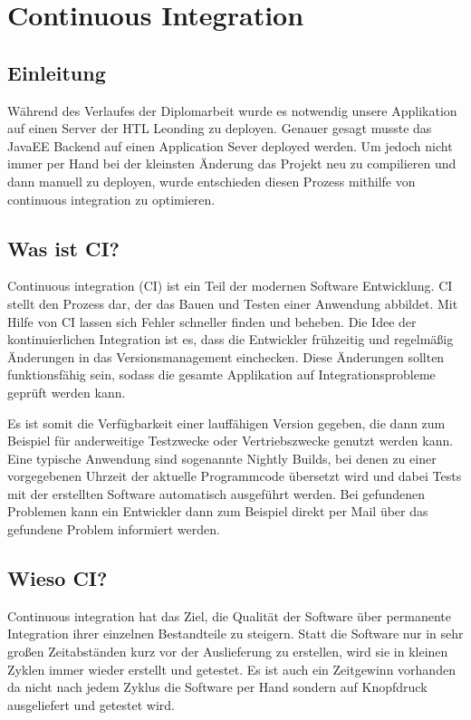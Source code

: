 \chapter{Continuous Integration}
\section{Einleitung}\label{sec:einleitung}
Während des Verlaufes der Diplomarbeit wurde es notwendig unsere Applikation auf einen Server der HTL Leonding zu deployen. Genauer gesagt musste das JavaEE Backend auf einen Application Sever deployed werden. Um jedoch nicht immer per Hand bei der kleinsten Änderung das Projekt neu zu compilieren und dann manuell zu deployen, wurde entschieden diesen Prozess mithilfe von continuous integration zu optimieren.

\section{Was ist CI?}\label{sec:cierklärung}
Continuous integration (CI) ist ein Teil der modernen Software Entwicklung. CI stellt den Prozess dar, der das Bauen und Testen einer Anwendung abbildet. Mit Hilfe von CI lassen sich Fehler schneller finden und beheben. Die Idee der kontinuierlichen Integration ist es, dass die Entwickler frühzeitig und regelmäßig Änderungen in das Versionsmanagement einchecken. Diese Änderungen sollten funktionsfähig sein, sodass die gesamte Applikation auf Integrationsprobleme geprüft werden kann.

Es ist somit die Verfügbarkeit einer lauffähigen Version gegeben, die dann zum Beispiel für anderweitige Testzwecke oder Vertriebszwecke genutzt werden kann. Eine typische Anwendung sind sogenannte Nightly Builds, bei denen zu einer vorgegebenen Uhrzeit der aktuelle Programmcode übersetzt wird und dabei Tests mit der erstellten Software automatisch ausgeführt werden. Bei gefundenen Problemen kann ein Entwickler dann zum Beispiel direkt per Mail über das gefundene Problem informiert werden.

\section{Wieso CI?}\label{sec:whyci}
Continuous integration hat das Ziel, die Qualität der Software über permanente Integration ihrer einzelnen Bestandteile zu steigern. Statt die Software nur in sehr großen Zeitabständen kurz vor der Auslieferung zu erstellen, wird sie in kleinen Zyklen immer wieder erstellt und getestet. Es ist auch ein Zeitgewinn vorhanden da nicht nach jedem Zyklus die Software per Hand sondern auf Knopfdruck ausgeliefert und getestet wird.

